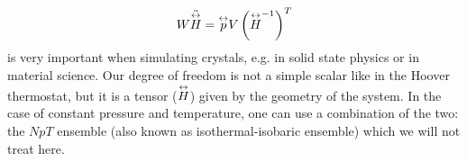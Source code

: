 \begin{equation}
W\ddot{\overset{\leftrightarrow}{H}} = \overset{\leftrightarrow}{p} V \left(\overset{\leftrightarrow}{H}^{-1}\right)^T
\end{equation}
is very important when simulating crystals, e.g. in solid state physics or in material science. Our degree of freedom is not a simple scalar like in the Hoover thermostat, but it is a tensor ($\overset{\leftrightarrow}{H}$) given by the geometry of the system. In the case of constant pressure and temperature, one can use a combination of the two: the $NpT$ ensemble (also known as isothermal-isobaric ensemble) which we will not treat here.



























